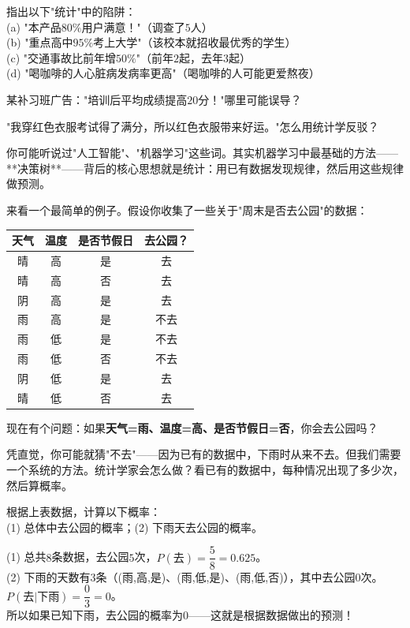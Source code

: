 \begin{exercise}
\item 指出以下"统计"中的陷阱：\\
(a) "本产品$80\%$用户满意！"（调查了$5$人）\\
(b) "重点高中$95\%$考上大学"（该校本就招收最优秀的学生）\\
(c) "交通事故比前年增$50\%$"（前年$2$起，去年$3$起）\\
(d) "喝咖啡的人心脏病发病率更高"（喝咖啡的人可能更爱熬夜）
\item 某补习班广告："培训后平均成绩提高$20$分！"哪里可能误导？
\item "我穿红色衣服考试得了满分，所以红色衣服带来好运。"怎么用统计学反驳？
\end{exercise}


你可能听说过"人工智能"、"机器学习"这些词。其实机器学习中最基础的方法——**决策树**——背后的核心思想就是统计：用已有数据发现规律，然后用这些规律做预测。

来看一个最简单的例子。假设你收集了一些关于"周末是否去公园"的数据：

\begin{center}
\begin{tabular}{c|c|c|c}
天气 & 温度 & 是否节假日 & 去公园？\\\hline
晴 & 高 & 是 & 去\\
晴 & 高 & 否 & 去\\
阴 & 高 & 是 & 去\\
雨 & 高 & 是 & 不去\\
雨 & 低 & 是 & 不去\\
雨 & 低 & 否 & 不去\\
阴 & 低 & 是 & 去\\
晴 & 低 & 否 & 去
\end{tabular}
\end{center}

现在有个问题：如果\textbf{天气=雨、温度=高、是否节假日=否}，你会去公园吗？

凭直觉，你可能就猜"不去"——因为已有的数据中，下雨时从来不去。但我们需要一个系统的方法。统计学家会怎么做？看已有的数据中，每种情况出现了多少次，然后算概率。

\begin{example}
根据上表数据，计算以下概率：\\
(1) 总体中去公园的概率；(2) 下雨天去公园的概率。
\end{example}
\begin{solution}
(1) 总共$8$条数据，去公园$5$次，$P(\text{去})=\dfrac58=0.625$。\\
(2) 下雨的天数有$3$条（(雨,高,是)、(雨,低,是)、(雨,低,否)），其中去公园$0$次。$P(\text{去}|\text{下雨})=\dfrac03=0$。\\
所以如果已知下雨，去公园的概率为$0$——这就是根据数据做出的预测！
\end{solution}

